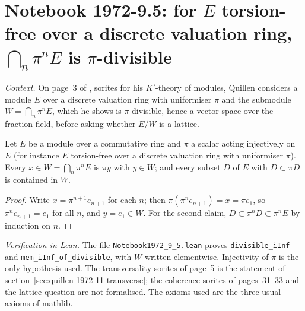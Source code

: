 \section[Notebook 1972-9.5: $\bigcap\pi^nE$ is the largest divisible part]{Notebook 1972-9.5: for $E$ torsion-free over a discrete valuation ring, $\bigcap_n\pi^nE$ is $\pi$-divisible\protect{}}\label{sec:quillen-1972-9-5}

\emph{Context.} On page~3 of , sorites for his $K'$-theory of modules, Quillen considers a module $E$ over a discrete valuation ring with uniformiser $\pi$ and the submodule $W = \bigcap_n\pi^nE$, which he shows is $\pi$-divisible, hence a vector space over the fraction field, before asking whether $E/W$ is a lattice.

\begin{encadre}
\begin{theoreme}\label{thm:quillen-1972-9-5}
Let $E$ be a module over a commutative ring and $\pi$ a scalar acting injectively on $E$ (for instance $E$ torsion-free over a discrete valuation ring with uniformiser $\pi$). Every $x \in W = \bigcap_n\pi^nE$ is $\pi y$ with $y \in W$; and every subset $D$ of $E$ with $D \subset \pi D$ is contained in $W$.
\end{theoreme}
\end{encadre}

\begin{proof}
Write $x = \pi^{n+1}e_{n+1}$ for each $n$; then $\pi(\pi^ne_{n+1}) = x = \pi e_1$, so $\pi^ne_{n+1} = e_1$ for all $n$, and $y = e_1 \in W$. For the second claim, $D \subset \pi^nD \subset \pi^nE$ by induction on $n$.
\end{proof}

\emph{Verification in Lean.} The file \href{\leanblobmain/Notebook1972_9_5.lean}{\texttt{Notebook1972\_9\_5.\allowbreak{}lean}} proves \texttt{divisible\_iInf} and \texttt{mem\_iInf\_of\_divisible}, with $W$ written elementwise. Injectivity of $\pi$ is the only hypothesis used. The transversality sorites of page~5 is the statement of section~\ref{sec:quillen-1972-11-transverse}; the coherence sorites of pages~31--33 and the lattice question are not formalised. The axioms used are the three usual axioms of mathlib.

